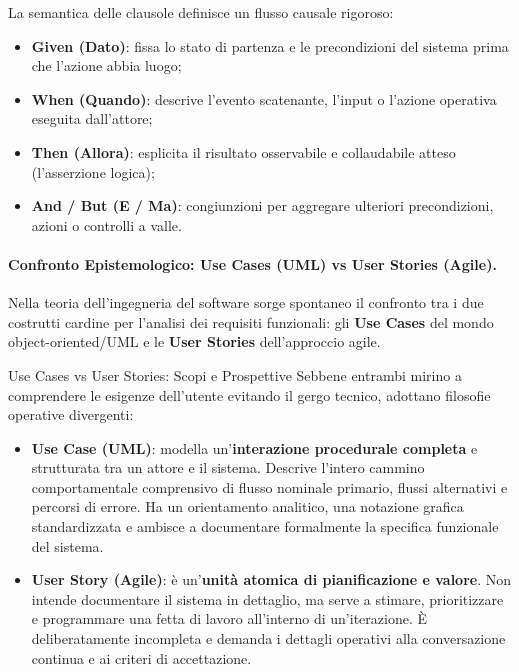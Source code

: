 \documentclass[12pt]{extarticle}
\begin{document}
\noindent La semantica delle clausole definisce un flusso causale rigoroso:
\begin{itemize}
    \item \textbf{Given (Dato)}: fissa lo stato di partenza e le precondizioni del sistema prima che l'azione abbia luogo;
    \item \textbf{When (Quando)}: descrive l'evento scatenante, l'input o l'azione operativa eseguita dall'attore;
    \item \textbf{Then (Allora)}: esplicita il risultato osservabile e collaudabile atteso (l'asserzione logica);
    \item \textbf{And / But (E / Ma)}: congiunzioni per aggregare ulteriori precondizioni, azioni o controlli a valle.
\end{itemize}

\paragraph{Confronto Epistemologico: Use Cases (UML) vs User Stories (Agile).}
Nella teoria dell'ingegneria del software sorge spontaneo il confronto tra i due costrutti cardine per l'analisi dei requisiti funzionali: gli \textbf{Use Cases} del mondo object-oriented/UML e le \textbf{User Stories} dell'approccio agile.

\begin{cbox}{Use Cases vs User Stories: Scopi e Prospettive}
\noindent Sebbene entrambi mirino a comprendere le esigenze dell'utente evitando il gergo tecnico, adottano filosofie operative divergenti:
\begin{itemize}
    \item \textbf{Use Case (UML)}: modella un'\textbf{interazione procedurale completa} e strutturata tra un attore e il sistema. Descrive l'intero cammino comportamentale comprensivo di flusso nominale primario, flussi alternativi e percorsi di errore. Ha un orientamento analitico, una notazione grafica standardizzata e ambisce a documentare formalmente la specifica funzionale del sistema.
    \item \textbf{User Story (Agile)}: è un'\textbf{unità atomica di pianificazione e valore}. Non intende documentare il sistema in dettaglio, ma serve a stimare, prioritizzare e programmare una fetta di lavoro all'interno di un'iterazione. È deliberatamente incompleta e demanda i dettagli operativi alla conversazione continua e ai criteri di accettazione.
\end{itemize}
\end{cbox}
\end{document}
